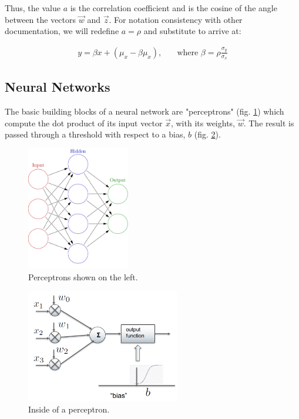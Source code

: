 \documentclass[11pt,a4paper]{article}
\begin{document}
Thus, the value $a$ is the correlation coefficient and is the cosine of the angle between the vectors $\vec{w}$ and $\vec{z}$. For notation consistency with other documentation, we will redefine $a= \rho$ and substitute to arrive at:

\begin{align*}
y = \beta x + (\mu_x - \beta \mu_x), \quad	&\text{where $\beta = \rho \frac{\sigma_y}{\sigma_x}$}
\end{align*}

\subsection{Neural Networks}
The basic building blocks of a neural network are "perceptrons" (fig. \ref{fig:nn}) which compute the dot product of its input vector $\vec{x}$, with its weights, $\vec{w}$. The result is passed through a threshold with respect to a bias, $b$ (fig. \ref{fig:nn1}).

\begin{figure}
\centering
\includegraphics[width=0.4\textwidth]{nn}
\caption{Perceptrons shown on the left.}
\label{fig:nn}
\end{figure}

\begin{figure}
\centering
\includegraphics[width=0.6\textwidth]{nn1}
\caption{Inside of a perceptron.}
\label{fig:nn1}
\end{figure}
\end{document}
